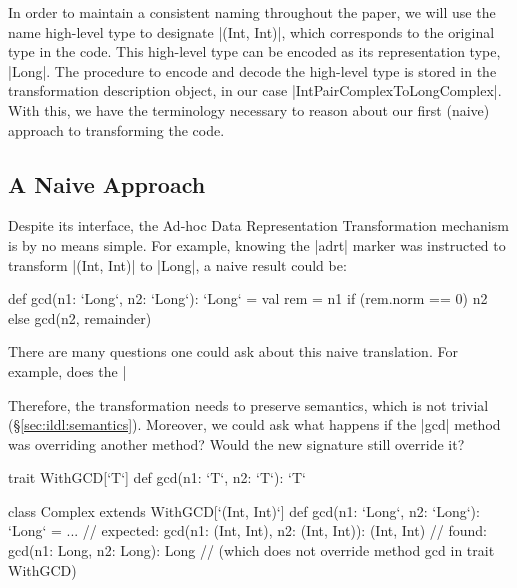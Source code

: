 In order to maintain a consistent naming throughout the paper, we will use the name high-level type to designate |(Int, Int)|, which corresponds to the original type in the code. This high-level type can be encoded as its representation type, |Long|. The procedure to encode and decode the high-level type is stored in the transformation description object, in our case |IntPairComplexToLongComplex|. With this, we have the terminology necessary to reason about our first (naive) approach to transforming the code.

\subsection{A Naive Approach}

Despite its interface, the Ad-hoc Data Representation Transformation mechanism is by no means simple. For example, knowing the |adrt| marker was instructed to transform |(Int, Int)| to |Long|, a naive result could be:

\begin{lstlisting-nobreak}
def gcd(n1: `Long`, n2: `Long`): `Long` = {
  val rem = n1 %
  if (rem.norm == 0) n2 else gcd(n2, remainder)
}
\end{lstlisting-nobreak}

There are many questions one could ask about this naive translation. For example, does the |%

Therefore, the transformation needs to preserve semantics, which is not trivial (\S\ref{sec:ildl:semantics}). Moreover, we could ask what happens if the |gcd| method was overriding another method? Would the new signature still override it?


\begin{lstlisting-nobreak}
trait WithGCD[`T`] {
  def gcd(n1: `T`, n2: `T`): `T`
}

class Complex extends WithGCD[`(Int, Int)`] {
  def gcd(n1: `Long`, n2: `Long`): `Long` = ...
  // expected: gcd(n1: (Int, Int), n2: (Int, Int)): (Int, Int)
  // found:    gcd(n1: Long, n2: Long): Long
  // (which does not override method gcd in trait WithGCD)
}
\end{lstlisting-nobreak}
%

